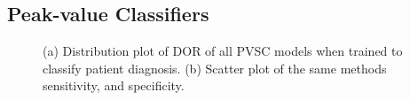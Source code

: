 \newpage

\subsection{Peak-value Classifiers}

\begin{figure}[H]
    \centering
    
    \caption{(a) Distribution plot of DOR of all PVSC models when trained to classify patient diagnosis.
             (b) Scatter plot of the same methods sensitivity, and specificity.}
    \label{fig:pvmlc_ind_dor_sens_spec_dist}
\end{figure}

